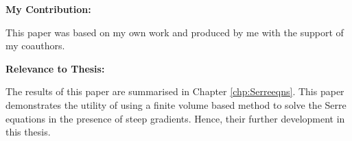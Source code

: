 	\noindent\textbf{My Contribution:}
	
	This paper was based on my own work and produced by me with the support of my coauthors.
\vspace*{\baselineskip}


	\noindent\textbf{Relevance to Thesis:}
	
	The results of this paper are summarised in Chapter \ref{chp:Serreeqns}. This paper demonstrates the utility of using a finite volume based method to solve the Serre equations in the presence of steep gradients. Hence, their further development in this thesis.	